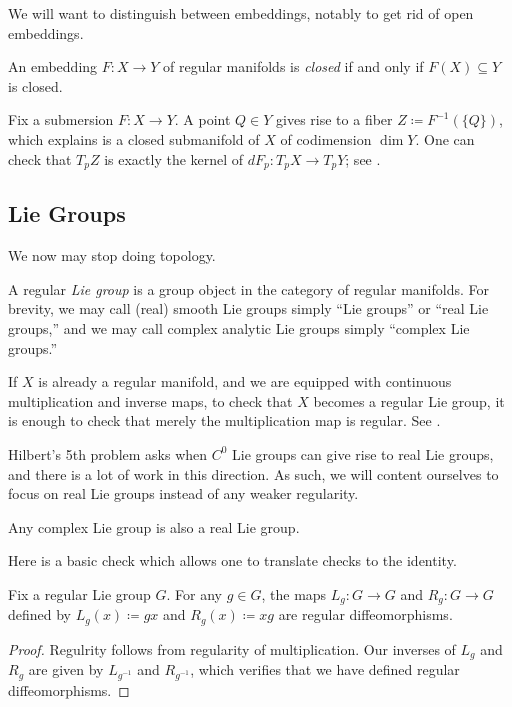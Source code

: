 \documentclass[../notes.tex]{subfiles}
\begin{document}
We will want to distinguish between embeddings, notably to get rid of open embeddings.
\begin{definition}[closed]
	An embedding $F\colon X\to Y$ of regular manifolds is \textit{closed} if and only if $F(X)\subseteq Y$ is closed.
\end{definition}
\begin{example}
	Fix a submersion $F\colon X\to Y$. A point $Q\in Y$ gives rise to a fiber $Z\coloneqq F^{-1}(\{Q\})$, which  explains is a closed submanifold of $X$ of codimension $\dim Y$. One can check that $T_pZ$ is exactly the kernel of $dF_p\colon T_pX\to T_pY$; see \cite[Proposition~5.37]{lee-manifolds}.
\end{example}

\subsection{Lie Groups}
We now may stop doing topology.
\begin{definition}
	A regular \textit{Lie group} is a group object in the category of regular manifolds. For brevity, we may call (real) smooth Lie groups simply ``Lie groups'' or ``real Lie groups,'' and we may call complex analytic Lie groups simply ``complex Lie groups.''
\end{definition}
\begin{remark}
	If $X$ is already a regular manifold, and we are equipped with continuous multiplication and inverse maps, to check that $X$ becomes a regular Lie group, it is enough to check that merely the multiplication map is regular. See \cite[Exercise~7-3]{lee-manifolds}.
\end{remark}
\begin{remark}
	Hilbert's 5th problem asks when $C^0$ Lie groups can give rise to real Lie groups, and there is a lot of work in this direction. As such, we will content ourselves to focus on real Lie groups instead of any weaker regularity.
\end{remark}
\begin{remark}
	Any complex Lie group is also a real Lie group.
\end{remark}
Here is a basic check which allows one to translate checks to the identity.
\begin{lemma}
	Fix a regular Lie group $G$. For any $g\in G$, the maps $L_g\colon G\to G$ and $R_g\colon G\to G$ defined by $L_g(x)\coloneqq gx$ and $R_g(x)\coloneqq xg$ are regular diffeomorphisms.
\end{lemma}
\begin{proof}
	Regulrity follows from regularity of multiplication. Our inverses of $L_g$ and $R_g$ are given by $L_{g^{-1}}$ and $R_{g^{-1}}$, which verifies that we have defined regular diffeomorphisms.
\end{proof}
\end{document}
